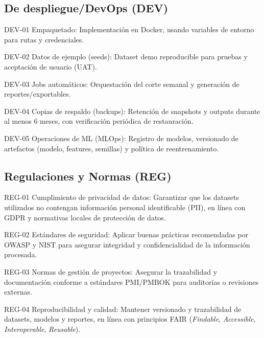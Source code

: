 \documentclass[12pt]
{charter}
\begin{document}
\subsection{De despliegue/DevOps (DEV)}
\begin{description}
  \item DEV-01 Empaquetado: Implementación en Docker, usando variables de entorno para rutas y credenciales.

  \item DEV-02 Datos de ejemplo (seeds): Dataset demo reproducible para pruebas y aceptación de usuario (UAT).
  
  \item DEV-03 Jobs automáticos: Orquestación del corte semanal y generación de reportes/exportables.
  
  \item DEV-04 Copias de respaldo (backups): Retención de snapshots y outputs durante al menos 6 meses, con verificación periódica de restauración.
  
  \item DEV-05 Operaciones de ML (MLOps): Registro de modelos, versionado de artefactos (modelo, features, semillas) y política de reentrenamiento.

\end{description}

\subsection{Regulaciones y Normas (REG)}
\begin{description}
  \item REG-01 Cumplimiento de privacidad de datos: Garantizar que los datasets utilizados no contengan información personal identificable (PII), en línea con GDPR y normativas locales de protección de datos.
  \item REG-02 Estándares de seguridad: Aplicar buenas prácticas recomendadas por OWASP y NIST para asegurar integridad y confidencialidad de la información procesada.
  \item REG-03 Normas de gestión de proyectos: Asegurar la trazabilidad y documentación conforme a estándares PMI/PMBOK para auditorías o revisiones externas.
  \item REG-04 Reproducibilidad y calidad: Mantener versionado y trazabilidad de datasets, modelos y reportes, en línea con principios FAIR (\textit{Findable}, \textit{Accessible}, \textit{Interoperable}, \textit{Reusable}).
\end{description}
\end{document}
